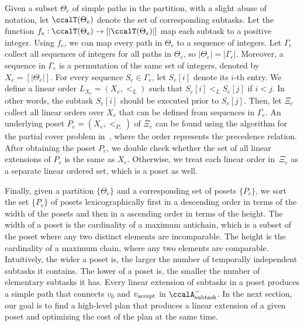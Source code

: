 \documentclass[Afour,sageh,times]{sagej}
\newcommand{\auto}[1]{\ccalA_{\textup{#1}}}
\newcommand{\vertex}[1]{v_{\textup{#1}}}
\begin{document}
Given a subset $\Theta_e$ of simple paths in the partition, with a slight abuse of notation, let $\ccalT(\Theta_e)$ denote the set of corresponding  subtasks. Let the function $f_e:\ccalT(\Theta_e)\to [|\ccalT(\Theta_e)|]$ map each subtask to a positive integer. Using $f_e$, we can map every path in $\Theta_e$ to a sequence of integers. Let $\Gamma_e$ collect all sequences of integers for all paths in $\Theta_e$, so $|\Theta_e| =  |\Gamma_e|$. Moreover, a sequence in $\Gamma_e$ is a permutation of the same set of integers, denoted by $X_e = [|\Theta_e|]$. For every sequence $S_e \in \Gamma_e$, let $S_e[i]$ denote its $i$-th entry. We define a linear order $L_{X_e} = (X_e, <_L)$ such that  $S_e[i]  <_L  S_e[j] $ if $i  <  j$. In other words, the subtask $S_e[i]$ should be executed prior to  $S_e[j]$. Then, let $\Xi_e$ collect all linear orders over $X_e$ that can be defined from sequences in $\Gamma_e$. An underlying poset $P_e  = (X_e, <_{P_e})$ of $\Xi_e$ can be found using the algorithm for the partial cover problem in~\cite{heath2013poset}, where the order represents the precedence relation. After obtaining the poset $P_e$, we double check whether the set of all linear extensions of $P_e$ is the same as $X_e$. Otherwise, we treat each linear order in~$\Xi_e$ as a separate linear ordered set, which is a poset as well.

{Finally, given a partition $\{\Theta_e\}$ and a corresponding set of posets $\{P_e\}$, we sort the set $\{P_e\}$ of posets   lexicographically first in a descending order in terms of the width of the posets and then in a ascending order in terms of the height.  The width of a poset  is the cardinality of a maximum antichain, which is a subset of the poset where any two distinct elements are incomparable. The height is the cardinality of a maximum chain, where any two elements are comparable. Intuitively, the wider a poset is, the larger the number of temporally independent subtasks it contains. The lower of a poset is, the smaller the number of elementary subtasks it has.} Every linear extension of subtasks in a poset produces a simple path that connects $v_0$ and $\vertex{accept}$ in $\auto{subtask}^-$. In the next section, our goal is to find a high-level plan that produces a linear extension of a given poset and optimizing the cost of the plan at the same time.
\end{document}
